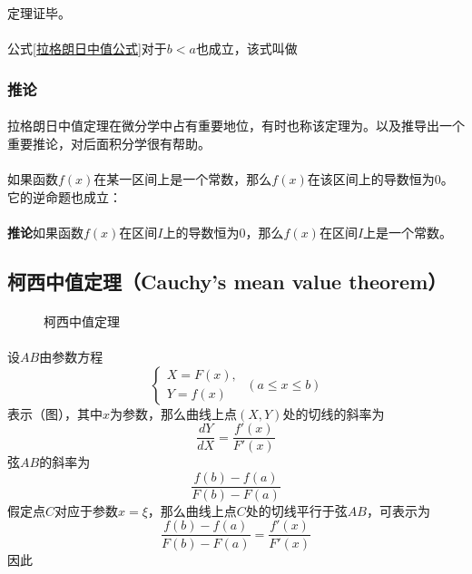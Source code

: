 定理证毕。

\paragraph{}
公式\eqref{拉格朗日中值公式}对于$b<a$也成立，该式叫做

\subsubsection{推论}
\paragraph{}
拉格朗日中值定理在微分学中占有重要地位，有时也称该定理为。以及推导出一个重要推论，对后面积分学很有帮助。

\paragraph{}
如果函数$f(x)$在某一区间上是一个常数，那么$f(x)$在该区间上的导数恒为$0$。它的逆命题也成立：

\paragraph{}
\textbf{推论\;}如果函数$f(x)$在区间$I$上的导数恒为$0$，那么$f(x)$在区间$I$上是一个常数。

\subsection{柯西中值定理（Cauchy's mean value theorem）}
\paragraph{}
\begin{figure}[H]
  \centering
    
    \caption{柯西中值定理}
    \label{Cauchy‘s mean value theorem}
\end{figure}

\paragraph{}
设$AB$由参数方程
\begin{equation}
  \left\{
    \begin{array}{l}
      X = F(x), \\
      Y = f(x)
    \end{array}
    \;(a \leq x \leq b)
  \right.
\end{equation}
表示（图），其中$x$为参数，那么曲线上点$(X,Y)$处的切线的斜率为
\begin{equation}
  \frac{dY}{dX}=\frac{f'(x)}{F'(x)}
\end{equation}
弦$AB$的斜率为
\begin{equation}
  \frac{f(b)-f(a)}{F(b)-F(a)}
\end{equation}
假定点$C$对应于参数$x=\xi$，那么曲线上点$C$处的切线平行于弦$AB$，可表示为
\begin{equation}
  \frac{f(b)-f(a)}{F(b)-F(a)} = \frac{f'(x)}{F'(x)}
\end{equation}
因此

